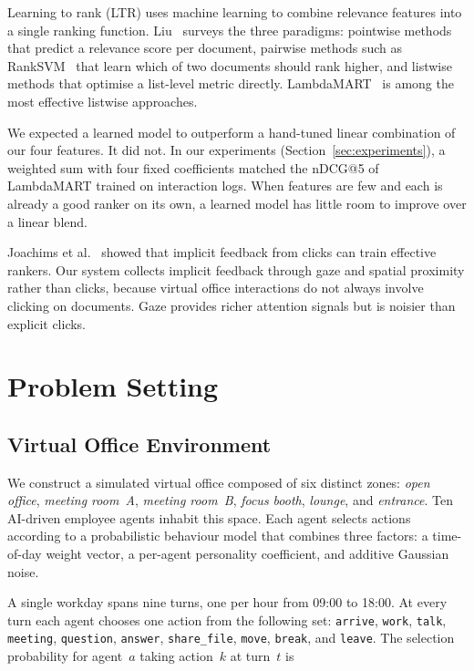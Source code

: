 \documentclass[journal]{IEEEtran}
\begin{document}
Learning to rank (LTR) uses machine learning to combine relevance features into a single ranking function. Liu~\cite{liu2009learning} surveys the three paradigms: pointwise methods that predict a relevance score per document, pairwise methods such as RankSVM~\cite{joachims2002optimizing} that learn which of two documents should rank higher, and listwise methods that optimise a list-level metric directly. LambdaMART~\cite{burges2010ranknet} is among the most effective listwise approaches.

We expected a learned model to outperform a hand-tuned linear combination of our four features. It did not. In our experiments (Section~\ref{sec:experiments}), a weighted sum with four fixed coefficients matched the nDCG@5 of LambdaMART trained on interaction logs. When features are few and each is already a good ranker on its own, a learned model has little room to improve over a linear blend.

Joachims et al.~\cite{joachims2005accurately} showed that implicit feedback from clicks can train effective rankers. Our system collects implicit feedback through gaze and spatial proximity rather than clicks, because virtual office interactions do not always involve clicking on documents. Gaze provides richer attention signals but is noisier than explicit clicks.

\section{Problem Setting}
\label{sec:setting}

\subsection{Virtual Office Environment}
\label{ssec:virtual_office}

We construct a simulated virtual office composed of six distinct zones:
\emph{open office}, \emph{meeting room~A}, \emph{meeting room~B},
\emph{focus booth}, \emph{lounge}, and \emph{entrance}.
Ten AI-driven employee agents inhabit this space.
Each agent selects actions according to a probabilistic behaviour model
that combines three factors: a time-of-day weight vector, a
per-agent personality coefficient, and additive Gaussian noise.

A single workday spans nine turns, one per hour from 09{:}00 to
18{:}00.  At every turn each agent chooses one action from the
following set: \texttt{arrive}, \texttt{work}, \texttt{talk},
\texttt{meeting}, \texttt{question}, \texttt{answer},
\texttt{share\_file}, \texttt{move}, \texttt{break}, and
\texttt{leave}.  The selection probability for agent~$a$ taking
action~$k$ at turn~$t$ is
\end{document}
